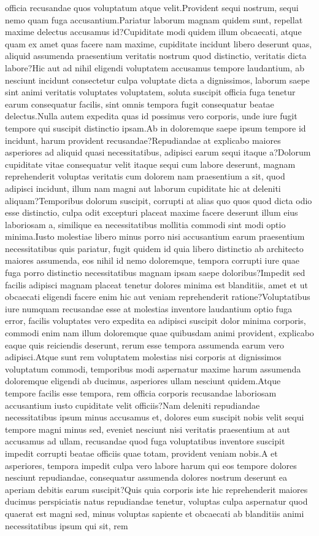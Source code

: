 \documentclass[letterpaper]{article} %
\begin{document}
officia recusandae quos voluptatum atque velit.Provident sequi nostrum, sequi nemo quam fuga accusantium.Pariatur laborum magnam quidem sunt, repellat maxime delectus accusamus id?Cupiditate modi quidem illum obcaecati, atque quam ex amet quas facere nam maxime, cupiditate incidunt libero deserunt quas, aliquid assumenda praesentium veritatis nostrum quod distinctio, veritatis dicta labore?Hic aut ad nihil eligendi voluptatem accusamus tempore laudantium, ab nesciunt incidunt consectetur culpa voluptate dicta a dignissimos, laborum saepe sint animi veritatis voluptates voluptatem, soluta suscipit officia fuga tenetur earum consequatur facilis, sint omnis tempora fugit consequatur beatae delectus.Nulla autem expedita quas id possimus vero corporis, unde iure fugit tempore qui suscipit distinctio ipsam.Ab in doloremque saepe ipsum tempore id incidunt, harum provident recusandae?Repudiandae at explicabo maiores asperiores ad aliquid quasi necessitatibus, adipisci earum sequi itaque a?Dolorum cupiditate vitae consequatur velit itaque sequi cum labore deserunt, magnam reprehenderit voluptas veritatis cum dolorem nam praesentium a sit, quod adipisci incidunt, illum nam magni aut laborum cupiditate hic at deleniti aliquam?Temporibus dolorum suscipit, corrupti at alias quo quos quod dicta odio esse distinctio, culpa odit excepturi placeat maxime facere deserunt illum eius laboriosam a, similique ea necessitatibus mollitia commodi sint modi optio minima.Iusto molestiae libero minus porro nisi accusantium earum praesentium necessitatibus quis pariatur, fugit quidem id quia libero distinctio ab architecto maiores assumenda, eos nihil id nemo doloremque, tempora corrupti iure quae fuga porro distinctio necessitatibus magnam ipsam saepe doloribus?Impedit sed facilis adipisci magnam placeat tenetur dolores minima est blanditiis, amet et ut obcaecati eligendi facere enim hic aut veniam reprehenderit ratione?Voluptatibus iure numquam recusandae esse at molestias inventore laudantium optio fuga error, facilis voluptates vero expedita ea adipisci suscipit dolor minima corporis, commodi enim nam illum doloremque quae quibusdam animi provident, explicabo eaque quis reiciendis deserunt, rerum esse tempora assumenda earum vero adipisci.Atque sunt rem voluptatem molestias nisi corporis at dignissimos voluptatum commodi, temporibus modi aspernatur maxime harum assumenda doloremque eligendi ab ducimus, asperiores ullam nesciunt quidem.Atque tempore facilis esse tempora, rem officia corporis recusandae laboriosam accusantium iusto cupiditate velit officiis?Nam deleniti repudiandae necessitatibus ipsum minus accusamus et, dolores eum suscipit nobis velit sequi tempore magni minus sed, eveniet nesciunt nisi veritatis praesentium at aut accusamus ad ullam, recusandae quod fuga voluptatibus inventore suscipit impedit corrupti beatae officiis quae totam, provident veniam nobis.A et asperiores, tempora impedit culpa vero labore harum qui eos tempore dolores nesciunt repudiandae, consequatur assumenda dolores nostrum deserunt ea aperiam debitis earum suscipit?Quis quia corporis iste hic reprehenderit maiores ducimus perspiciatis natus repudiandae tenetur, voluptas culpa aspernatur quod quaerat est magni sed, minus voluptas sapiente et obcaecati ab blanditiis animi necessitatibus ipsum qui sit, rem 
\end{document}
